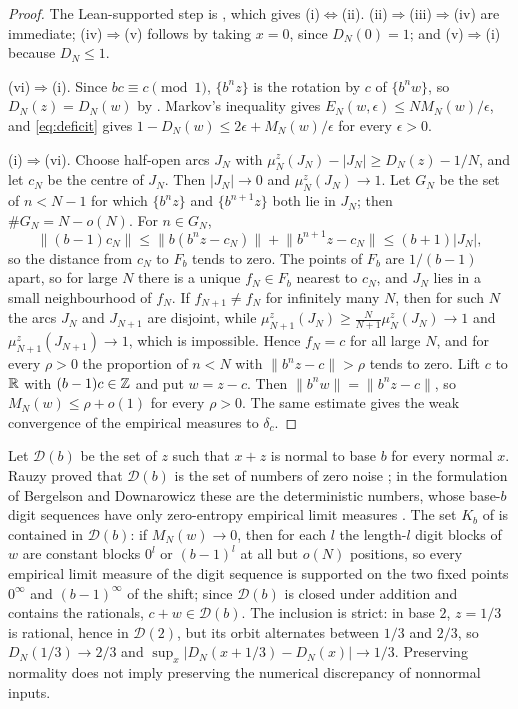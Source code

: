\documentclass[11pt]{article}
\newcommand{\dist}[1]{\lVert #1\rVert}
\newcommand{\fr}[1]{\{#1\}}
\begin{document}
\begin{proof}
The Lean-supported step is , which gives (i)$\Leftrightarrow$(ii).
(ii)$\Rightarrow$(iii)$\Rightarrow$(iv) are immediate; (iv)$\Rightarrow$(v) follows by taking $x=0$,
since $D_N(0)=1$; and (v)$\Rightarrow$(i) because $D_N\le1$.

(vi)$\Rightarrow$(i). Since $bc\equiv c\pmod1$, $\fr{b^nz}$ is the rotation by $c$ of $\fr{b^nw}$, so
$D_N(z)=D_N(w)$ by . Markov's inequality gives $E_N(w,\epsilon)\le NM_N(w)/\epsilon$,
and \eqref{eq:deficit} gives $1-D_N(w)\le2\epsilon+M_N(w)/\epsilon$ for every $\epsilon>0$.

(i)$\Rightarrow$(vi). Choose half-open arcs $J_N$ with $\mu_N^z(J_N)-|J_N|\ge D_N(z)-1/N$, and let
$c_N$ be the centre of $J_N$. Then $|J_N|\to0$ and $\mu_N^z(J_N)\to1$. Let $G_N$ be the set of $n<N-1$
for which $\fr{b^nz}$ and $\fr{b^{n+1}z}$ both lie in $J_N$; then $\#G_N=N-o(N)$. For $n\in G_N$,
\[
\dist{(b-1)c_N}\le\dist{b(b^nz-c_N)}+\dist{b^{n+1}z-c_N}\le(b+1)|J_N|,
\]
so the distance from $c_N$ to $F_b$ tends to zero. The points of $F_b$ are $1/(b-1)$ apart, so for
large $N$ there is a unique $f_N\in F_b$ nearest to $c_N$, and $J_N$ lies in a small neighbourhood of
$f_N$. If $f_{N+1}\ne f_N$ for infinitely many $N$, then for such $N$ the arcs $J_N$ and $J_{N+1}$
are disjoint, while $\mu_{N+1}^z(J_N)\ge\frac N{N+1}\mu_N^z(J_N)\to1$ and $\mu_{N+1}^z(J_{N+1})\to1$,
which is impossible. Hence $f_N=c$ for all large $N$, and for every $\rho>0$ the proportion of
$n<N$ with $\dist{b^nz-c}>\rho$ tends to zero. Lift $c$ to $\mathbb R$ with $(b-1)c\in\mathbb Z$ and put $w=z-c$.
Then $\dist{b^nw}=\dist{b^nz-c}$, so $M_N(w)\le\rho+o(1)$ for every $\rho>0$. The same estimate gives
the weak convergence of the empirical measures to $\delta_c$.
\end{proof}

\begin{remark}\label{rem:rauzy}
Let $\mathcal D(b)$ be the set of $z$ such that $x+z$ is normal to base $b$ for every normal $x$.
Rauzy proved that $\mathcal D(b)$ is the set of numbers of zero noise \cite{Rauzy76}; in the
formulation of Bergelson and Downarowicz these are the deterministic numbers, whose base-$b$ digit
sequences have only zero-entropy empirical limit measures \cite[Definitions~3.5 and~3.10,
Theorem~3.12]{BD25}. The set $K_b$ of  is contained in $\mathcal D(b)$: if
$M_N(w)\to0$, then for each $l$ the length-$l$ digit blocks of $w$ are constant blocks $0^l$ or
$(b-1)^l$ at all but $o(N)$ positions, so every empirical limit measure of the digit sequence is
supported on the two fixed points $0^\infty$ and $(b-1)^\infty$ of the shift; since $\mathcal D(b)$ is closed under addition and
contains the rationals, $c+w\in\mathcal D(b)$. The
inclusion is strict: in base $2$, $z=1/3$ is rational, hence in $\mathcal D(2)$, but its orbit
alternates between $1/3$ and $2/3$, so $D_N(1/3)\to2/3$ and $\sup_x|D_N(x+1/3)-D_N(x)|\to1/3$.
Preserving normality does not imply preserving the numerical discrepancy of nonnormal inputs.
\end{remark}
\end{document}
